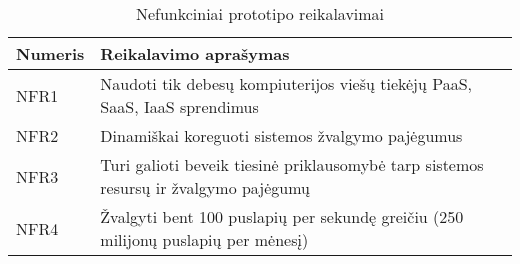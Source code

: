 \begin{table}[htbp]
  \centering
  \caption{Nefunkciniai prototipo reikalavimai}
    \begin{tabular}{|l|p{23.785em}|}
    \hline
    \textbf{Numeris} & \multicolumn{1}{l|}{\textbf{Reikalavimo aprašymas}} \bigstrut\\
    \hline
    NFR1   & Naudoti tik debesų kompiuterijos viešų tiekėjų PaaS, SaaS, IaaS sprendimus \bigstrut\\
    \hline
    NFR2   & Dinamiškai koreguoti sistemos žvalgymo pajėgumus \bigstrut\\
    \hline
        NFR3   & Turi galioti beveik tiesinė priklausomybė tarp sistemos resursų ir žvalgymo pajėgumų \bigstrut\\
    \hline
            NFR4   & Žvalgyti bent 100 puslapių per sekundę greičiu (250 milijonų puslapių per mėnesį) \bigstrut\\
    \hline
    \end{tabular}%
  \label{tab:non_functional_requirements}%
\end{table}%

